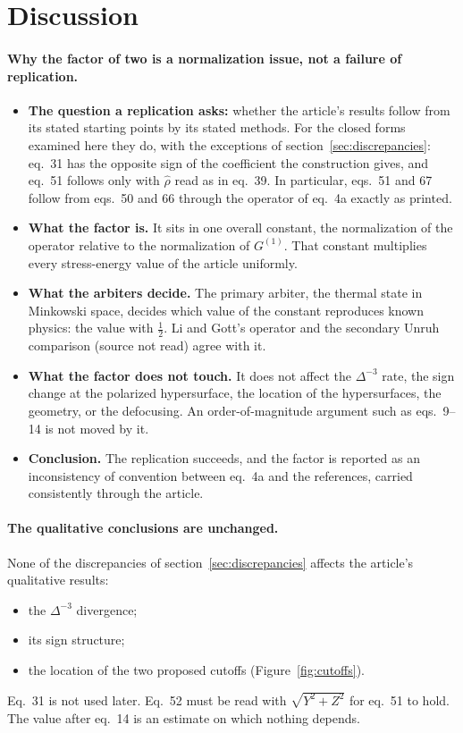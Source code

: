 \section{Discussion}

\paragraph{Why the factor of two is a normalization issue, not a failure of replication.}
\begin{itemize}
\item \textbf{The question a replication asks:} whether the article's results follow from its stated starting points by its stated methods. For the closed forms examined here they do, with the exceptions of section~\ref{sec:discrepancies}: eq.~31 has the opposite sign of the coefficient the construction gives, and eq.~51 follows only with $\hat\rho$ read as in eq.~39. In particular, eqs.~51 and 67 follow from eqs.~50 and 66 through the operator of eq.~4a exactly as printed.
\item \textbf{What the factor is.} It sits in one overall constant, the normalization of the operator relative to the normalization of $G^{(1)}$. That constant multiplies every stress-energy value of the article uniformly.
\item \textbf{What the arbiters decide.} The primary arbiter, the thermal state in Minkowski space, decides which value of the constant reproduces known physics: the value with $\tfrac12$. Li and Gott's operator and the secondary Unruh comparison (source not read) agree with it.
\item \textbf{What the factor does not touch.} It does not affect the $\Delta^{-3}$ rate, the sign change at the polarized hypersurface, the location of the hypersurfaces, the geometry, or the defocusing. An order-of-magnitude argument such as eqs.~9--14 is not moved by it.
\item \textbf{Conclusion.} The replication succeeds, and the factor is reported as an inconsistency of convention between eq.~4a and the references, carried consistently through the article.
\end{itemize}

\paragraph{The qualitative conclusions are unchanged.} None of the discrepancies of section~\ref{sec:discrepancies} affects the article's qualitative results:
\begin{itemize}
\item the $\Delta^{-3}$ divergence;
\item its sign structure;
\item the location of the two proposed cutoffs (Figure~\ref{fig:cutoffs}).
\end{itemize}
Eq.~31 is not used later. Eq.~52 must be read with $\sqrt{Y^2+Z^2}$ for eq.~51 to hold. The value after eq.~14 is an estimate on which nothing depends.

